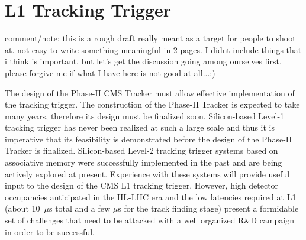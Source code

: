 \section{L1 Tracking Trigger}

comment/note: 
this is a rough draft really meant as a target for people to shoot at. not easy to write something meaningful in 2 pages.   I didnt include
things that i think is important. but let's get the discussion going among ourselves first. please forgive me if what I have here is not good at all...:)


\noindent 


	The design of the Phase-II CMS Tracker must allow effective implementation of the tracking trigger. The construction of the Phase-II Tracker is expected to take many years, therefore its design must be finalized soon. Silicon-based Level-1 tracking trigger has never been realized at such a large scale and thus it is imperative that its feasibility is demonstrated before the design of the Phase-II Tracker is finalized.  Silicon-based Level-2 tracking trigger systems based on associative memory were successfully implemented in the past and are being actively explored at present. Experience with these systems will provide useful input to the design of the CMS L1 tracking trigger. However, high detector occupancies anticipated in the HL-LHC era and the low latencies required at L1 (about 10~$\mu$s total and a few $\mu$s for the track finding stage) present a formidable set of challenges that need to be attacked with a well organized R\&D campaign in order to be successful. 

